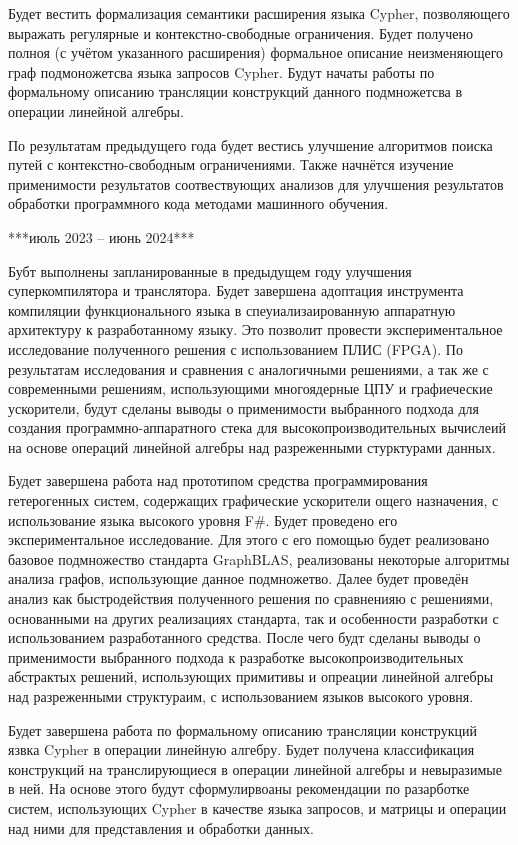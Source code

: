 \documentclass[12pt]{article}  %
\theoremstyle{remark}
\begin{document}
Будет вестить формализация семантики расширения языка Cypher, позволяющего выражать регулярные и контекстно-свободные ограничения. Будет получено полноя (с учётом указанного расширения) формальное описание неизменяющего граф подмоножетсва языка запросов Cypher. Будут начаты работы по формальному описанию трансляции конструкций данного подмножетсва в операции линейной алгебры.

По результатам предыдущего года будет вестись улучшение алгоритмов поиска путей с контекстно-свободным ограничениями. Также начнётся изучение применимости результатов соотвествующих анализов для улучшения результатов обработки программного кода методами машинного обучения.

***июль 2023 -- июнь 2024***

Бубт выполнены запланированные в предыдущем году улучшения суперкомпилятора и транслятора.
Будет завершена адоптация инструмента компиляции функционального языка в спеуиализаированную аппаратную архитектуру к разработанному языку. Это позволит провести экспериментальное исследование полученного решения с использованием ПЛИС (FPGA). По результатам исследования и сравнения с аналогичными решениями, а так же с современными решениям, использующими многоядерные ЦПУ и графиеческие ускорители, будут сделаны выводы о применимости выбранного подхода для создания программно-аппаратного стека для высокопроизводительных вычислеий на основе операций линейной алгебры над разреженными стурктурами данных.

Будет завершена работа над прототипом средства программирования гетерогенных систем, содержащих графические ускорители ощего назначения, с использование языка высокого уровня F\#. Будет проведено его экспериментальное исследование. Для этого с его помощью будет реализовано базовое подмножество стандарта GraphBLAS, реализованы некоторые алгоритмы анализа графов, использующие данное подмножетво. Далее будет проведён анализ как быстродействия полученного решения по сравненияю с решениями, основанными на других реализациях стандарта, так и особенности разработки с использованием разработанного средства. После чего будт сделаны выводы о применимости выбранного подхода к разработке высокопроизводительных абстрактых решений, использующих примитивы и опреации линейной алгебры над разреженными структураим, с использованием языков высокого уровня.

Будет завершена работа по формальному описанию трансляции конструкций язвка Cypher в операции линейную алгебру. Будет получена классификация конструкций на транслирующиеся в операции линейной алгебры и невыразимые в ней. На основе этого будут сформулирвоаны рекомендации по разарботке систем, использующих Cypher в качестве языка запросов, и матрицы и операции над ними для представления и обработки данных.
\end{document}
